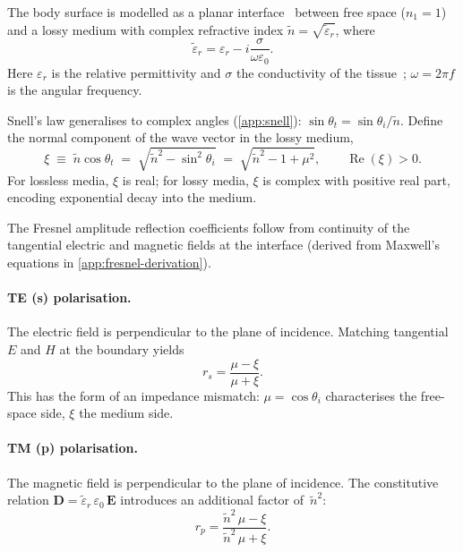 \documentclass[11pt,a4paper]{article}
\theoremstyle{definition}      %
\newcommand{\EE}{\mathbf{E}}
\newcommand{\ntilde}{\tilde{n}}
\newcommand{\epstilde}{\tilde{\varepsilon}_r}
\DeclareMathOperator{\RE}{Re}
\begin{document}
The body surface is modelled as a planar interface~\cite{BornWolf1999}
between free space ($n_1=1$) and a lossy medium with complex refractive index
$\ntilde = \sqrt{\epstilde}$, where
\begin{equation}\label{eq:eps-complex}
  \epstilde = \varepsilon_r - i\frac{\sigma}{\omega\varepsilon_0}.
\end{equation}
Here $\varepsilon_r$ is the relative permittivity and $\sigma$ the
conductivity of the tissue~\cite{Gabriel1996,ITISv5}; $\omega=2\pi f$
is the angular frequency.

Snell's law generalises to complex angles
(\cref{app:snell}):
$\sin\theta_t = \sin\theta_i/\ntilde$.  Define the normal component
of the wave vector in the lossy medium,
\begin{equation}\label{eq:xi-def}
  \xi \;\equiv\; \ntilde\cos\theta_t
  \;=\; \sqrt{\ntilde^2 - \sin^2\theta_i}
  \;=\; \sqrt{\ntilde^2 - 1 + \mu^2},
  \qquad \RE(\xi)>0.
\end{equation}
For lossless media, $\xi$ is real; for lossy media, $\xi$ is complex
with positive real part, encoding exponential decay into the medium.

The Fresnel amplitude reflection coefficients follow from continuity
of the tangential electric and magnetic fields at the interface
(derived from Maxwell's equations in \cref{app:fresnel-derivation}).

\paragraph{TE (s) polarisation.}
The electric field is perpendicular to the plane of incidence.
Matching tangential $E$ and $H$ at the boundary yields
\begin{equation}\label{eq:rs}
  r_s = \frac{\mu - \xi}{\mu + \xi}.
\end{equation}
This has the form of an impedance mismatch: $\mu=\cos\theta_i$
characterises the free-space side, $\xi$ the medium side.

\paragraph{TM (p) polarisation.}
The magnetic field is perpendicular to the plane of incidence.
The constitutive relation $\mathbf{D}=\epstilde\,\varepsilon_0\,\EE$
introduces an additional factor of~$\ntilde^2$:
\begin{equation}\label{eq:rp}
  r_p = \frac{\ntilde^2\,\mu - \xi}{\ntilde^2\,\mu + \xi}.
\end{equation}
\end{document}
